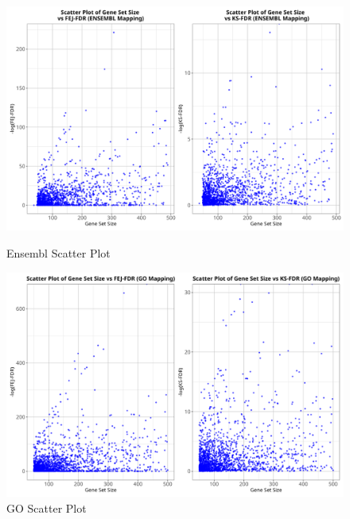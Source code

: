 \documentclass[12pt]{article}
\begin{document}
\begin{figure}[htpb]
    \centering
    \begin{minipage}{0.49\textwidth}
        \centering
        \includegraphics[width=\textwidth]{./plots/ensScatt.png}
        \caption{Ensembl Scatter Plot}
        \label{fig:ens-scatt}
    \end{minipage}
    \hfill
    \begin{minipage}{0.49\textwidth}
        \centering
        \includegraphics[width=\textwidth]{./plots/goScatt.png}
        \caption{GO Scatter Plot}
        \label{fig:go-scatt}
    \end{minipage}
\end{figure}
\end{document}
